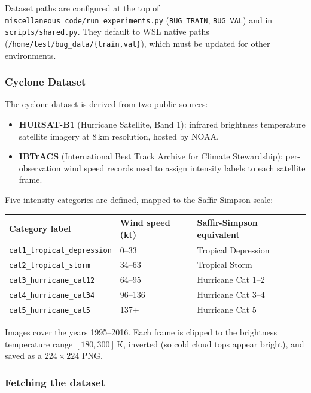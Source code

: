 \documentclass[12pt,a4paper]{article}
\begin{document}
Dataset paths are configured at the top of \texttt{miscellaneous\_code/run\_experiments.py}
(\texttt{BUG\_TRAIN}, \texttt{BUG\_VAL}) and in \texttt{scripts/shared.py}.
They default to WSL native paths (\texttt{/home/test/bug\_data/\{train,val\}}),
which must be updated for other environments.

\subsubsection{Cyclone Dataset}
\label{sec:pg-data-cyclone}

The cyclone dataset is derived from two public sources:
\begin{itemize}
    \item \textbf{HURSAT-B1} (Hurricane Satellite, Band 1): infrared brightness
          temperature satellite imagery at $8\,\text{km}$ resolution,
          hosted by NOAA.
    \item \textbf{IBTrACS} (International Best Track Archive for Climate
          Stewardship): per-observation wind speed records used to assign
          intensity labels to each satellite frame.
\end{itemize}

Five intensity categories are defined, mapped to the Saffir-Simpson scale:

\begin{center}
\begin{tabular}{lll}
\toprule
\textbf{Category label} & \textbf{Wind speed (kt)} & \textbf{Saffir-Simpson equivalent} \\
\midrule
\texttt{cat1\_tropical\_depression} & 0--33   & Tropical Depression \\
\texttt{cat2\_tropical\_storm}      & 34--63  & Tropical Storm \\
\texttt{cat3\_hurricane\_cat12}     & 64--95  & Hurricane Cat 1--2 \\
\texttt{cat4\_hurricane\_cat34}     & 96--136 & Hurricane Cat 3--4 \\
\texttt{cat5\_hurricane\_cat5}      & 137+    & Hurricane Cat 5 \\
\bottomrule
\end{tabular}
\end{center}

Images cover the years 1995--2016. Each frame is clipped to the brightness
temperature range $[180, 300]\,\text{K}$, inverted (so cold cloud tops appear
bright), and saved as a $224\times224$ PNG.

\subsubsection*{Fetching the dataset}
\end{document}
